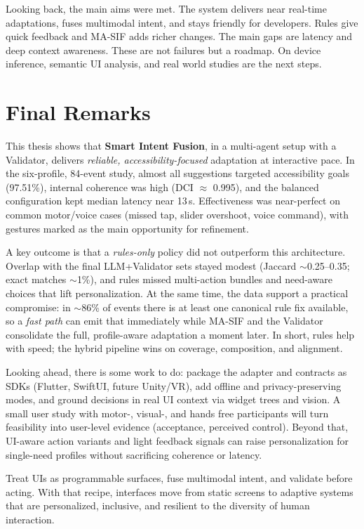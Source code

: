 Looking back, the main aims were met. The system delivers near real-time adaptations, fuses multimodal intent, and stays friendly for developers. Rules give quick feedback and MA-SIF adds richer changes. The main gaps are latency and deep context awareness. These are not failures but a roadmap. On device inference, semantic UI analysis, and real world studies are the next steps.

\section{Final Remarks}
This thesis shows that \textbf{Smart Intent Fusion}, in a multi-agent setup with a Validator, delivers \emph{reliable, accessibility-focused} adaptation at interactive pace. In the six-profile, 84-event study, almost all suggestions targeted accessibility goals (97.51\%), internal coherence was high (DCI $\approx$ 0.995), and the balanced configuration kept median latency near 13\,s. Effectiveness was near-perfect on common motor/voice cases (missed tap, slider overshoot, voice command), with gestures marked as the main opportunity for refinement.

A key outcome is that a \emph{rules-only} policy did not outperform this architecture. Overlap with the final LLM+Validator sets stayed modest (Jaccard $\sim$0.25–0.35; exact matches $\sim$1\%), and rules missed multi-action bundles and need-aware choices that lift personalization. At the same time, the data support a practical compromise: in $\sim$86\% of events there is at least one canonical rule fix available, so a \emph{fast path} can emit that immediately while MA-SIF and the Validator consolidate the full, profile-aware adaptation a moment later. In short, rules help with speed; the hybrid pipeline wins on coverage, composition, and alignment.

Looking ahead, there is some work to do: package the adapter and contracts as SDKs (Flutter, SwiftUI, future Unity/VR), add offline and privacy-preserving modes, and ground decisions in real UI context via widget trees and vision. A small user study with motor-, visual-, and hands free participants will turn feasibility into user-level evidence (acceptance, perceived control). Beyond that, UI-aware action variants and light feedback signals can raise personalization for single-need profiles without sacrificing coherence or latency.

Treat UIs as programmable surfaces, fuse multimodal intent, and validate before acting. With that recipe, interfaces move from static screens to adaptive systems that are personalized, inclusive, and resilient to the diversity of human interaction.